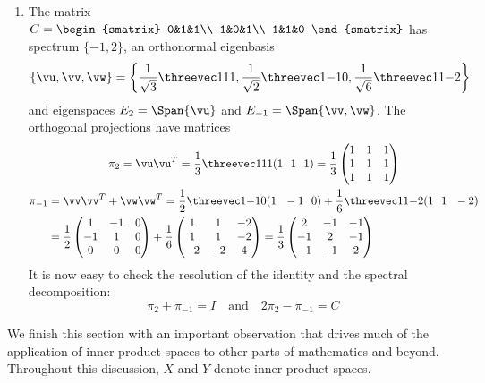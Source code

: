 \begin{examples}{}{}
\begin{enumerate}
	\item The matrix $C=\begin{smatrix}
		0&1&1\\
		1&0&1\\
		1&1&0
	\end{smatrix}$ has spectrum $\{-1,2\}$, an orthonormal eigenbasis
	\[\{\vu,\vv,\vw\} =\left\{\frac 1{\sqrt 3}\threevec 111, \frac 1{\sqrt 2}\threevec 1{-1}0,\frac 1{\sqrt 6}\threevec 11{-2} \right\}\]
	and eigenspaces $E_2=\Span\{\vu\}$ and $E_{-1}=\Span\{\vv,\vw\}$. The orthogonal projections have matrices
	\begin{gather*}
		\pi_2=\vu\vu^T=\frac 13\threevec 111(1\ \ 1\ \ 1)
		=\frac 13\begin{pmatrix}
			1&1&1\\
			1&1&1\\
			1&1&1
		\end{pmatrix}\\
		\begin{aligned}
			\pi_{-1}&=\vv\vv^T+\vw\vw^T
			=\frac 12\threevec 1{-1}0(1\ \ -1\ \ 0)+\frac 16\threevec 11{-2}(1\ \ 1\ \ -2)\\
			&=\frac 12\begin{pmatrix}
				1&-1&0\\
				-1&1&0\\
				0&0&0
			\end{pmatrix}+\frac 16\begin{pmatrix}
				1&1&-2\\
				1&1&-2\\
				-2&-2&4
			\end{pmatrix}
			=\frac 13\begin{pmatrix}
				2&-1&-1\\
				-1&2&-1\\
				-1&-1&2
			\end{pmatrix}
		\end{aligned}
	\end{gather*}
	It is now easy to check the resolution of the identity and the spectral decomposition:
	\[\pi_2+\pi_{-1}=I\quad\text{and}\quad 2\pi_2-\pi_{-1}=C\]
\end{enumerate}
\end{examples}

\vfil\goodbreak

\label{sec:leastsq}

We finish this section with an important observation that drives much of the application of inner product spaces to other parts of mathematics and beyond. Throughout this discussion, $X$ and $Y$ denote inner product spaces.


